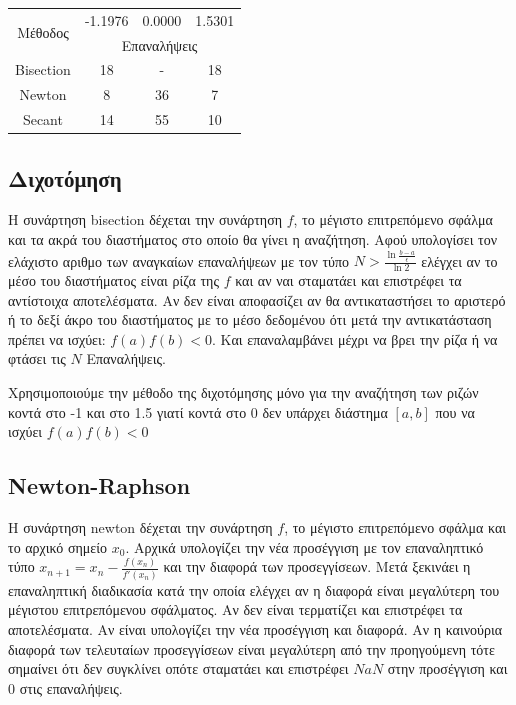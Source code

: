 \documentclass[a4paper,11pt]{article}
\begin{document}
\begin{flushleft}
    
    
\begin{table}[h]
    \centering
    \begin{tabular}{|c|c|c|c|}
        \hline
        \multirow{2}{*}{Μέθοδος} & -1.1976 & 0.0000 & 1.5301 \\ \cline{2-4}  & \multicolumn{3}{c|}{Επαναλήψεις} \\
        \hline
        Bisection & 18 & - & 18 \\ \hline
        Newton & 8 & 36 & 7 \\  \hline
        Secant & 14 & 55 & 10 \\ \hline
    \end{tabular}
\end{table}

\subsection*{Διχοτόμηση}
Η συνάρτηση bisection δέχεται την συνάρτηση $f$, το μέγιστο επιτρεπόμενο σφάλμα και τα ακρά του διαστήματος στο οποίο θα γίνει η αναζήτηση. Αφού υπολογίσει τον ελάχιστο αριθμο των αναγκαίων επαναλήψεων με τον τύπο 
$N > \frac{\ln{\frac{b-a}{\epsilon}}}{\ln{2}}$ 
ελέγχει αν το μέσο του διαστήματος είναι ρίζα της $f$ και αν ναι σταματάει και επιστρέφει τα αντίστοιχα αποτελέσματα. Αν δεν είναι αποφασίζει αν θα αντικαταστήσει το αριστερό ή το δεξί άκρο του διαστήματος με το μέσο δεδομένου ότι μετά την αντικατάσταση πρέπει να ισχύει: $f(a)f(b)<0$. Και επαναλαμβάνει μέχρι να βρει την ρίζα ή να φτάσει τις $N$ Επαναλήψεις.
\linebreak

Χρησιμοποιούμε την μέθοδο της διχοτόμησης μόνο για την αναζήτηση των ριζών κοντά στο -1 και στο 1.5 γιατί κοντά στο 0 δεν υπάρχει διάστημα $[a,b]$ που να ισχύει $f(a)f(b)<0$
\linebreak

\subsection*{Newton-Raphson}
Η συνάρτηση newton δέχεται την συνάρτηση $f$, το μέγιστο επιτρεπόμενο σφάλμα και το αρχικό σημείο $x_0$. Αρχικά υπολογίζει την νέα προσέγγιση με τον επαναληπτικό τύπο $x_{n+1} = x_n-\frac{f(x_n)}{f'(x_n)}$ και την διαφορά των προσεγγίσεων. Μετά ξεκινάει η επαναληπτική διαδικασία κατά την οποία ελέγχει αν η διαφορά είναι μεγαλύτερη του μέγιστου επιτρεπόμενου σφάλματος. Αν δεν είναι τερματίζει και επιστρέφει τα αποτελέσματα. Αν είναι υπολογίζει την νέα προσέγγιση και διαφορά. Αν η καινούρια διαφορά των τελευταίων προσεγγίσεων είναι μεγαλύτερη από την προηγούμενη τότε σημαίνει ότι δεν συγκλίνει οπότε σταματάει και επιστρέφει $NaN$ στην προσέγγιση και $0$ στις επαναλήψεις.
\linebreak


\end{flushleft}
\end{document}

